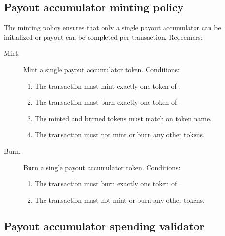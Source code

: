 \documentclass[../midgard.tex]{subfiles}
\begin{document}
\subsection{Payout accumulator minting policy}%
\label{h:payout-accumulator-minting-policy}%

The  minting policy ensures that only a single payout accumulator can be initialized or payout can be completed per transaction.
Redeemers:
\begin{description}
  \item[Mint.] Mint a single payout accumulator token.
    Conditions:
    \begin{enumerate}
      \item The transaction must mint exactly one token of .
      \item The transaction must burn exactly one token of .
      \item The minted and burned tokens must match on token name.
      \item The transaction must not mint or burn any other tokens.
    \end{enumerate}
  \item[Burn.] Burn a single payout accumulator token.
    Conditions:
    \begin{enumerate}
      \item The transaction must burn exactly one token of .
      \item The transaction must not mint or burn any other tokens.
    \end{enumerate}
\end{description}

\subsection{Payout accumulator spending validator}%
\label{h:payout-accumulator-spending-validator}%
\end{document}
